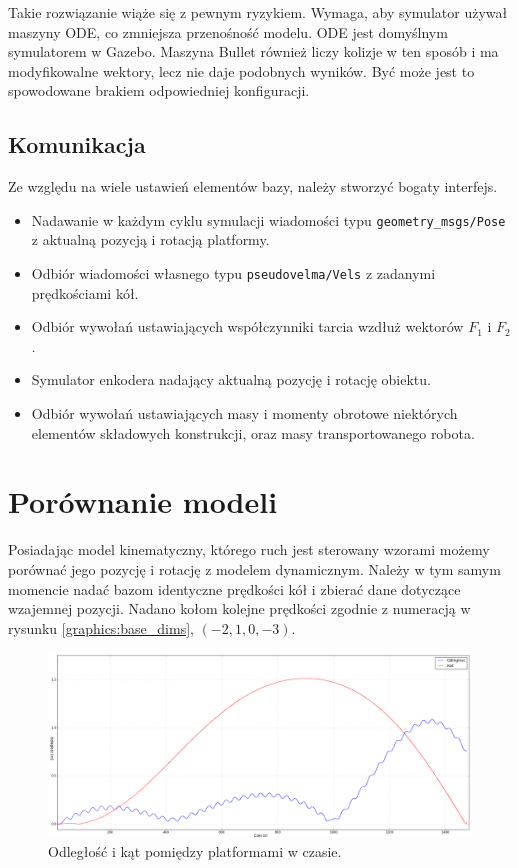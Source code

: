 Takie rozwiązanie wiąże się z pewnym ryzykiem.
Wymaga, aby symulator używał maszyny ODE, co zmniejsza przenośność modelu. ODE jest domyślnym symulatorem w Gazebo.
Maszyna Bullet również liczy kolizje w ten sposób i ma modyfikowalne wektory, lecz nie daje podobnych wyników. Być może jest to spowodowane brakiem odpowiedniej konfiguracji.

\subsection{Komunikacja}
Ze względu na wiele ustawień elementów bazy, należy stworzyć bogaty interfejs.
\begin{itemize}
 \item Nadawanie w każdym cyklu symulacji wiadomości typu \texttt{geometry\_msgs/Pose} z aktualną pozycją i rotacją platformy.
 \item Odbiór wiadomości własnego typu \texttt{pseudovelma/Vels} z zadanymi prędkościami kół.
 \item Odbiór wywołań ustawiających współczynniki tarcia wzdłuż wektorów $F_1$ i $F_2$.
 \item Symulator enkodera nadający aktualną pozycję i rotację obiektu.
 \item Odbiór wywołań ustawiających masy i momenty obrotowe niektórych elementów składowych konstrukcji, oraz masy transportowanego robota.
\end{itemize}

\section{Porównanie modeli}
Posiadając model kinematyczny, którego ruch jest sterowany wzorami możemy porównać jego pozycję i rotację z modelem dynamicznym.
Należy w tym samym momencie nadać bazom identyczne prędkości kół i zbierać dane dotyczące wzajemnej pozycji.
Nadano kołom kolejne prędkości zgodnie z numeracją w rysunku \ref{graphics:base_dims}, $(-2 , 1 , 0 , -3)$.

\begin{figure}[H]
\centering
 \includegraphics[width=\textwidth]{graphics/test1.png}
\caption{Odległość i kąt pomiędzy platformami w czasie.}
\end{figure} 

